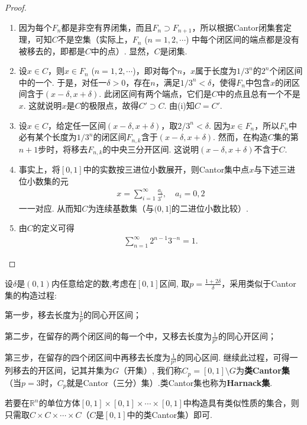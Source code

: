 \documentclass[../../main.tex]{subfiles}%
\begin{document}
\begin{proof}
\begin{enumerate}[(1)]
\item 因为每个$F_n$都是非空有界闭集，而且$F_n\supset F_{n + 1}$，所以根据Cantor闭集套定理，可知$C$不是空集（实际上，$F_n$ ($n = 1,2,\cdots$) 中每个闭区间的端点都是没有被移去的，即都是$C$中的点）. 显然，$C$是闭集.

\item 设$x\in C$，则$x\in F_n$ ($n = 1,2,\cdots$)，即对每个$n$，$x$属于长度为$1/3^n$的$2^n$个闭区间中的一个. 于是，对任一$\delta>0$，存在$n$，满足$1/3^n<\delta$，使得$F_n$中包含$x$的闭区间含于$(x - \delta, x + \delta)$. 此闭区间有两个端点，它们是$C$中的点且总有一个不是$x$. 这就说明$x$是$C$的极限点，故得$C'\supset C$. 由(i)知$C = C'$.

\item 设$x\in C$，给定任一区间$(x - \delta, x + \delta)$，取$2/3^n<\delta$. 因为$x\in F_n$，所以$F_n$中必有某个长度为$1/3^n$的闭区间$F_{n,k}$含于$(x - \delta, x + \delta)$. 然而，在构造$C$集的第$n + 1$步时，将移去$F_{n,k}$的中央三分开区间. 这说明$(x - \delta, x + \delta)$不含于$C$.

\item 事实上，将$[0,1]$中的实数按三进位小数展开，则Cantor集中点$x$与下述三进位小数集的元
\begin{align*}
x=\sum_{i = 1}^{\infty}\frac{a_i}{3^i}, \quad a_i = 0,2
\end{align*}
一一对应. 从而知$C$为连续基数集（与$(0,1]$的二进位小数比较）. 

\item 由$C$的定义可得
\begin{align*}
\sum_{n = 1}^{\infty}2^{n - 1}3^{-n}=1.
\end{align*}
\end{enumerate}

\end{proof}

\begin{definition}[类Cantor集]
设$\delta$是$(0,1)$内任意给定的数,考虑在$[0,1]$区间, 取$p=\frac{1+2\delta}{\delta}$，采用类似于Cantor集的构造过程:

第一步，移去长度为$\frac{1}{p}$的同心开区间；

第二步，在留存的两个闭区间的每一个中，又移去长度为$\frac{1}{p^2}$的同心开区间；

第三步，在留存的四个闭区间中再移去长度为$\frac{1}{p^3}$的同心区间. 继续此过程，可得一列移去的开区间，记其并集为$G$（开集）,
我们称$C_p=[0,1]\setminus G$为\textbf{类Cantor集}（当$p = 3$时，$C_p$就是Cantor（三分）集）.类Cantor集也称为\textbf{Harnack集}. 
\end{definition}
\begin{remark}
若要在$\mathbb{R}^n$的单位方体$[0,1]\times[0,1]\times\cdots\times[0,1]$中构造具有类似性质的集合，则只需取$C\times C\times\cdots\times C$（$C$是$[0,1]$中的类Cantor集）即可.
\end{remark}
\end{document}
